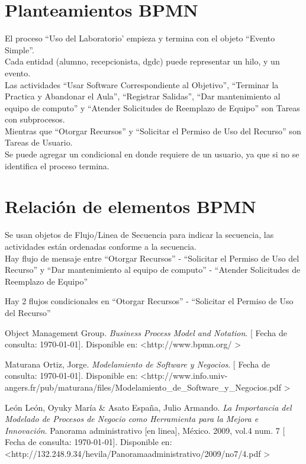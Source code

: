 \documentclass[spanish,12pt,letterpapper]{article}
\begin{document}
	\section{Planteamientos BPMN}
	El proceso ``Uso del Laboratorio' empieza y termina con el objeto ``Evento Simple''.\\
	
	Cada entidad (alumno, recepcionista, dgdc) puede representar un hilo, y un evento.\\
	
	Las actividades ``Usar Software Correspondiente al Objetivo'', ``Terminar la Practica y Abandonar el Aula'', ``Registrar Salidas'', ``Dar mantenimiento al equipo de computo'' y ``Atender Solicitudes de Reemplazo de Equipo'' son Tareas con subprocesos.\\
	
	Mientras que ``Otorgar Recursos'' y ``Solicitar el Permiso de Uso del Recurso'' son Tareas de Usuario.\\
	
	Se puede agregar un condicional en donde requiere de un usuario, ya que si no se identifica el proceso termina.\\
	
	\section{Relación de elementos  BPMN}
	Se usan objetos de Flujo/Linea de Secuencia para indicar la secuencia, las actividades están ordenadas conforme a la secuencia.\\
	
	Hay flujo de mensaje entre ``Otorgar Recursos'' - ``Solicitar el Permiso de Uso del Recurso'' y ``Dar mantenimiento al equipo de computo'' - ``Atender Solicitudes de Reemplazo de Equipo''
	
	Hay 2 flujos condicionales en ``Otorgar Recursos'' - ``Solicitar el Permiso de Uso del Recurso''
	
	\pagebreak
	\begin{thebibliography}{9}
	 Object Management Group. 
		\emph{Business Process Model and Notation}. {[} Fecha de consulta: \today {]}. Disponible en: \textless http://www.bpmn.org/ \textgreater	
	
		 Maturana Ortiz, Jorge. 
		\emph{Modelamiento de Software y Negocios}. {[} Fecha de consulta: \today {]}. Disponible en: \textless http://www.info.univ-angers.fr/pub/maturana/files/Modelamiento\_de\_Software\_y\_Negocios.pdf \textgreater
		
		 León León, Oyuky María \& Asato España, Julio Armando. 
		\emph{La Importancia del Modelado de Procesos de
			Negocio como Herramienta para la Mejora e
			Innovación}. Panorama administrativo {[}en linea{]}, México. 2009, vol.4 num. 7  {[} Fecha de consulta: \today {]}. Disponible en: \textless http://132.248.9.34/hevila/Panoramaadministrativo/2009/no7/4.pdf \textgreater
	\end{thebibliography}
\end{document}
